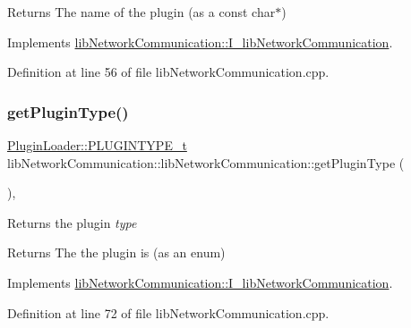 \begin{DoxyReturn}{Returns}
The name of the plugin (as a const char$\ast$) 
\end{DoxyReturn}


Implements \mbox{\hyperlink{classlibNetworkCommunication_1_1I__libNetworkCommunication_aa4a1a2180bdbf7b13ec0dd17f3cbb459}{lib\+Network\+Communication\+::\+I\+\_\+lib\+Network\+Communication}}.



Definition at line 56 of file lib\+Network\+Communication.\+cpp.

\mbox{\label{classlibNetworkCommunication_1_1libNetworkCommunication_a6851c7c48cde1af3d2b6e131fce6b8bc}} 
\subsubsection{\texorpdfstring{getPluginType()}{getPluginType()}}
{\footnotesize\ttfamily \mbox{\hyperlink{namespacePluginLoader_a7b1358e9577b47b5d4b16231a5a81699}{Plugin\+Loader\+::\+P\+L\+U\+G\+I\+N\+T\+Y\+P\+E\+\_\+t}} lib\+Network\+Communication\+::lib\+Network\+Communication\+::get\+Plugin\+Type (\begin{DoxyParamCaption}{ }\end{DoxyParamCaption})\hspace{0.3cm}{\ttfamily [override]}, {\ttfamily [virtual]}}



Returns the plugin {\itshape type} 

\begin{DoxyReturn}{Returns}
The the plugin is (as an enum) 
\end{DoxyReturn}


Implements \mbox{\hyperlink{classlibNetworkCommunication_1_1I__libNetworkCommunication_a22412ea75e41d612c66c42b3c4dab1f3}{lib\+Network\+Communication\+::\+I\+\_\+lib\+Network\+Communication}}.



Definition at line 72 of file lib\+Network\+Communication.\+cpp.

\mbox{\label{classlibNetworkCommunication_1_1libNetworkCommunication_a78dce6f61316f1f2068c0f03c7cc4b32}} 
